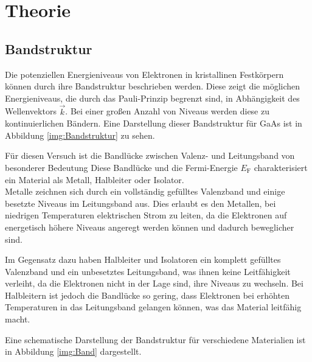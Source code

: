 \section{Theorie}
    \label{sec:Theorie}

    \subsection{Bandstruktur}

    Die potenziellen Energieniveaus von Elektronen in kristallinen Festkörpern können durch ihre Bandstruktur beschrieben werden.
    Diese zeigt die möglichen Energieniveaus, die durch das Pauli-Prinzip begrenzt sind, in Abhängigkeit des Wellenvektors $\vec{k}$.
    Bei einer großen Anzahl von Niveaus werden diese zu kontinuierlichen Bändern.
    Eine Darstellung dieser Bandstruktur für GaAs ist in Abbildung \autoref{img:Bandstruktur} zu sehen.


    Für diesen Versuch ist die Bandlücke zwischen Valenz- und Leitungsband von besonderer Bedeutung
    Diese Bandlücke und die Fermi-Energie $E_\text{F}$ charakterisiert ein Material als Metall, Halbleiter oder Isolator.\\

    Metalle zeichnen sich durch ein vollständig gefülltes Valenzband und einige besetzte Niveaus im Leitungsband aus. Dies erlaubt es den Metallen, bei niedrigen Temperaturen elektrischen Strom zu leiten, da die Elektronen auf energetisch höhere Niveaus angeregt werden können und dadurch beweglicher sind.

Im Gegensatz dazu haben Halbleiter und Isolatoren ein komplett gefülltes Valenzband und ein unbesetztes Leitungsband, was ihnen keine Leitfähigkeit verleiht, da die Elektronen nicht in der Lage sind, ihre Niveaus zu wechseln. Bei Halbleitern ist jedoch die Bandlücke so gering, dass Elektronen bei erhöhten Temperaturen in das Leitungsband gelangen können, was das Material leitfähig macht.

Eine schematische Darstellung der Bandstruktur für verschiedene Materialien ist in Abbildung \autoref{img:Band} dargestellt.



